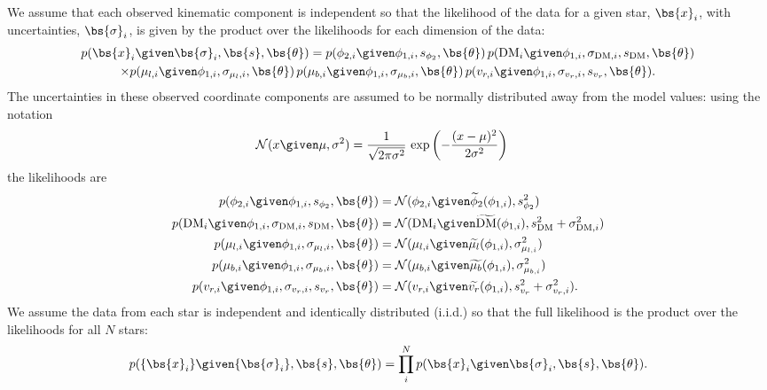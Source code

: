 \documentclass[numberedappendix]{emulateapj}
\newcommand{\DM}{{\rm DM}}
\newcommand{\norm}{\mathcal{N}}
\begin{document}
We assume that each observed kinematic component is independent so that the likelihood of the data for a given star, $\bs{x}_i$, with uncertainties, $\bs{\sigma}_i$, is given by the product over the likelihoods for each dimension of the data:
\begin{multline}
	p(\bs{x}_i \given \bs{\sigma}_i, \bs{s}, \bs{\theta}) = p(\phi_{2,i} \given \phi_{1,i}, s_{\phi_2},\bs{\theta}) \, p(\DM_i \given \phi_{1,i}, \sigma_{\DM,i}, s_\DM, \bs{\theta})\\ 
	\times p(\mu_{l,i} \given \phi_{1,i}, \sigma_{\mu_{l},i}, \bs{\theta}) \, p(\mu_{b,i} \given \phi_{1,i}, \sigma_{\mu_{b},i}, \bs{\theta}) \, p(v_{r,i} \given \phi_{1,i}, \sigma_{v_r,i}, s_{v_r}, \bs{\theta}).
\end{multline}
The uncertainties in these observed coordinate components are assumed to be normally distributed away from the model values: using the notation
\begin{align}
	\norm(x \given \mu, \sigma^2) &= \frac{1}{\sqrt{2\pi \sigma^2}} \, \exp\left(-\frac{(x-\mu)^2}{2\sigma^2}\right)
\end{align}
the likelihoods are
\begin{align}	
	p(\phi_{2,i} \given \phi_{1,i}, s_{\phi_2},\bs{\theta}) &= \norm(\phi_{2,i} \given \widetilde{\phi}_{2}(\phi_{1,i}), s^2_{\phi_2})\\
	p(\DM_i \given \phi_{1,i}, \sigma_{\DM,i}, s_\DM, \bs{\theta}) &= \norm(\DM_i \given \widetilde{\DM}(\phi_{1,i}), s^2_{\DM} + \sigma^2_{\DM,i})\\
	p(\mu_{l,i} \given \phi_{1,i}, \sigma_{\mu_{l},i}, \bs{\theta}) &= \norm(\mu_{l,i} \given \widetilde{\mu_{l}}(\phi_{1,i}), \sigma^2_{\mu_{l,i}})\\
	p(\mu_{b,i} \given \phi_{1,i}, \sigma_{\mu_{b},i}, \bs{\theta}) &= \norm(\mu_{b,i} \given \widetilde{\mu_{b}}(\phi_{1,i}), \sigma^2_{\mu_{b,i}})\\
	p(v_{r,i} \given \phi_{1,i}, \sigma_{v_r,i}, s_{v_r}, \bs{\theta}) &= \norm(v_{r,i} \given \widetilde{v_r}(\phi_{1,i}), s^2_{v_r} + \sigma^2_{v_r,i}).
\end{align}
We assume the data from each star is independent and identically distributed (i.i.d.) so that the full likelihood is the product over the likelihoods for all $N$ stars:
\begin{equation}
	 p(\{\bs{x}_i\} \given \{\bs{\sigma}_i\}, \bs{s}, \bs{\theta}) = \prod_i^N p(\bs{x}_i \given \bs{\sigma}_i, \bs{s}, \bs{\theta}).\label{eq:likelihood}
\end{equation}
\end{document}
